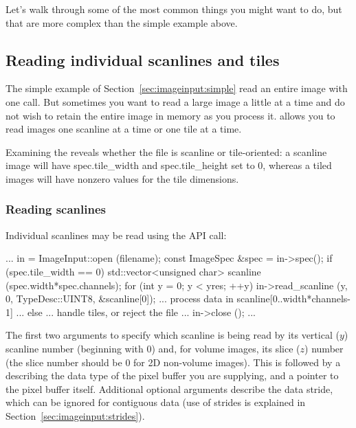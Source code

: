 Let's walk through some of the most common things you might want to do,
but that are more complex than the simple example above.


\subsection{Reading individual scanlines and tiles}
\label{sec:imageinput:scanlinestiles}

The simple example of Section~\ref{sec:imageinput:simple} read an
entire image with one call.  But sometimes you want to read a large
image a
little at a time and do not wish to retain the entire image in memory
as you process it.  \product allows you to read images
one scanline at a time or one tile at a time.

Examining the \ImageSpec reveals whether the file is scanline or
tile-oriented: a scanline image will have {\cf spec.tile_width} 
and {\cf spec.tile_height} set to 0, whereas a tiled images will
have nonzero values for the tile dimensions.


\subsubsection{Reading scanlines}

Individual scanlines may be read using the \readscanline API
call:

\begin{code}
        ...
        in = ImageInput::open (filename);
        const ImageSpec &spec = in->spec();
        if (spec.tile_width == 0) {
            std::vector<unsigned char> scanline (spec.width*spec.channels);
            for (int y = 0;  y < yres;  ++y) {
                in->read_scanline (y, 0, TypeDesc::UINT8, &scanline[0]);
                ... process data in scanline[0..width*channels-1] ...
            }
        } else {
            ... handle tiles, or reject the file ...
        }
        in->close ();
        ...
\end{code}

The first two arguments to \readscanline specify which scanline
is being read by its vertical ($y$) scanline number (beginning with 0)
and, for volume images, its slice ($z$) number (the slice number should
be 0 for 2D non-volume images).  This is followed by a \TypeDesc
describing the data type of the pixel buffer you are supplying, and a
pointer to the pixel buffer itself.  Additional optional arguments
describe the data stride, which can be ignored for contiguous data (use
of strides is explained in Section~\ref{sec:imageinput:strides}).

